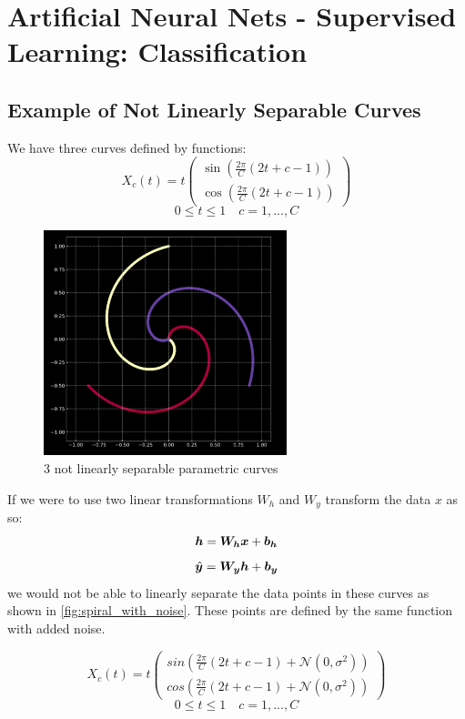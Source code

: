 \chapter{Artificial Neural Nets - Supervised Learning: Classification }

\section{Example of Not Linearly Separable Curves}

We have three curves defined by functions:
\[X_c(t) = t
\begin{pmatrix}
    \sin( \frac{2 \pi}{C}(2t + c -1)) \\
    \cos( \frac{2 \pi}{C}(2t + c -1))
\end{pmatrix}
 \]
\[ 0 \leq t \leq 1 \quad c = 1,..., C\]

\begin{figure}[ht]
    \centering
    \includegraphics[width=200pt]{figs/spiral1.png}
    \caption{3 not linearly separable parametric curves}
    \label{fig:spiral}
\end{figure}
 
\newpage

If we were to use two linear transformations $ W_h$ and $ W_y$  transform the data $x$ as so:
\[\matr{h}= \matr{W_h}\matr{x}+ \vect{b_h} \]
\[\hat{\vect{y}} = \matr{W_y} \matr{h} + \vect{b_y}\]
we would not be able to  linearly separate the data points in these curves as shown in \cref{fig:spiral_with_noise}.
These points are defined by the same function with added noise.

\[X_c(t) = t
\begin{pmatrix}
    sin( \frac{2 \pi}{C}(2t + c -1) + \mathcal{N} (0, \sigma ^2 )) \\
    cos( \frac{2 \pi}{C}(2t + c -1) + \mathcal{N} (0, \sigma ^2 ) )
\end{pmatrix}
 \]
\[ 0 \leq t \leq 1 \quad c = 1,..., C\]

